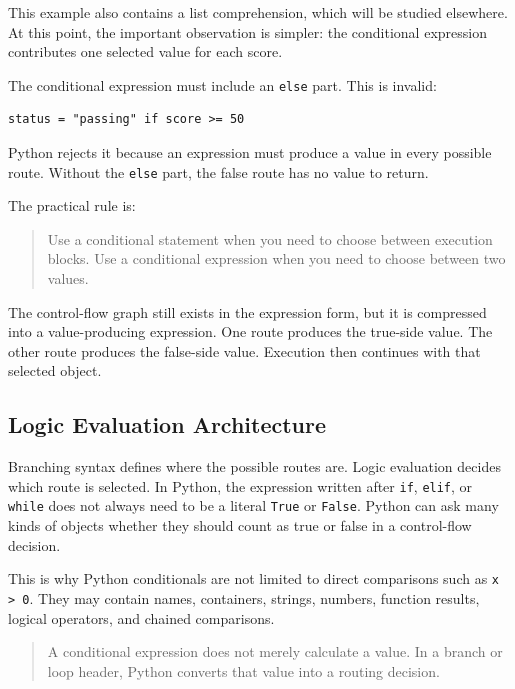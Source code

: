 \documentclass[a4paper,twoside]{report}
\begin{document}
This example also contains a list comprehension, which will be studied elsewhere. At this point, the important observation is simpler: the conditional expression contributes one selected value for each score.

The conditional expression must include an \texttt{else} part. This is invalid:

\begin{verbatim}
status = "passing" if score >= 50
\end{verbatim}

Python rejects it because an expression must produce a value in every possible route. Without the \texttt{else} part, the false route has no value to return.

The practical rule is:

\begin{quote}
Use a conditional statement when you need to choose between execution blocks. Use a conditional expression when you need to choose between two values.
\end{quote}

The control-flow graph still exists in the expression form, but it is compressed into a value-producing expression. One route produces the true-side value. The other route produces the false-side value. Execution then continues with that selected object.


\subsection{Logic Evaluation Architecture}

Branching syntax defines where the possible routes are. Logic evaluation decides which route is selected. In Python, the expression written after \texttt{if}, \texttt{elif}, or \texttt{while} does not always need to be a literal \texttt{True} or \texttt{False}. Python can ask many kinds of objects whether they should count as true or false in a control-flow decision.

This is why Python conditionals are not limited to direct comparisons such as \texttt{x > 0}. They may contain names, containers, strings, numbers, function results, logical operators, and chained comparisons.

\begin{quote}
A conditional expression does not merely calculate a value. In a branch or loop header, Python converts that value into a routing decision.
\end{quote}
\end{document}

